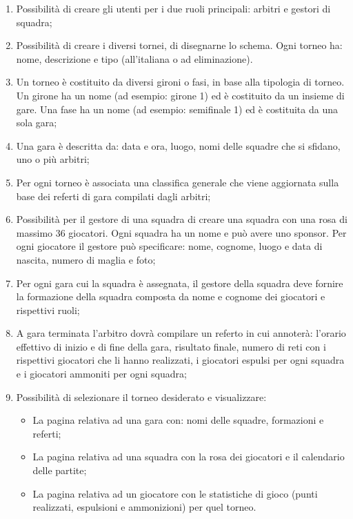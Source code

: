 \begin{enumerate}
	
	\item
	\label{sf-uadmin}
	Possibilità di creare gli utenti per i due ruoli principali: arbitri e gestori di squadra;
	
	\item
	Possibilità di creare i diversi tornei, di disegnarne lo schema. Ogni torneo ha: nome, descrizione e tipo (all'italiana o ad eliminazione).
	
	\item
	Un torneo è costituito da diversi gironi o fasi, in base alla tipologia di torneo. Un girone ha un nome (ad esempio: girone 1) ed è costituito da un insieme di gare. Una fase ha un nome (ad esempio: semifinale 1) ed è costituita da una sola gara;
	
	\item
	Una gara è descritta da: data e ora, luogo, nomi delle squadre che si sfidano, uno o più arbitri;
	
	\item
	\label{ef-uadmin}
	Per ogni torneo è associata una classifica generale che viene aggiornata sulla base dei referti di gara compilati dagli arbitri;
	
	\item
	\label{sf-ugestore}
	Possibilità per il gestore di una squadra di creare una squadra con una rosa di massimo 36 giocatori. Ogni squadra ha un nome e può avere uno sponsor. Per ogni giocatore il gestore può specificare: nome, cognome, luogo e data di nascita, numero di maglia e foto;
	
	\item
	\label{ef-ugestore}
	Per ogni gara cui la squadra è assegnata, il gestore della squadra deve fornire la formazione della squadra composta da nome e cognome dei giocatori e rispettivi ruoli;
	
	\item
	\label{f-uarbitro}
	A gara terminata l'arbitro dovrà compilare un referto in cui annoterà: l'orario effettivo di inizio e di fine della gara, risultato finale, numero di reti con i rispettivi giocatori che li hanno realizzati,  i giocatori espulsi per ogni squadra e i giocatori ammoniti per ogni squadra;
	
	\item
	\label{f-upubblico}
	Possibilità di selezionare il torneo desiderato e visualizzare:
	
	\begin{itemize}
		\item
		La pagina relativa ad una gara con: nomi delle squadre, formazioni e referti;
		
		\item
		La pagina relativa ad una squadra con la rosa dei giocatori e il calendario delle partite;
		
		\item
		La pagina relativa ad un giocatore con le statistiche di gioco (punti realizzati, espulsioni e ammonizioni) per quel torneo.
	\end{itemize}

\end{enumerate}

